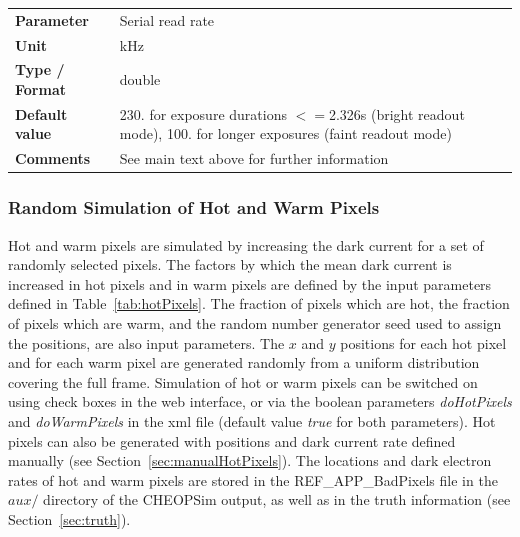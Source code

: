 \documentclass[11pt]{article}      %
\def\HCode#1{}
\def\htmlanchor#1{\HCode{<a id="#1"></a>}}
\begin{document}
\begin{table}[hb]
  \htmlanchor{serialReadRate}
  \begin{tabular}{| l | p{13cm} |}
    \hline 
    {\bf Parameter} & Serial read rate\\
    {\bf Unit} & kHz\\
    {\bf Type / Format} & double\\
    {\bf Default value} & 230. for exposure durations $<=$2.326s (bright readout mode), 100. for longer exposures (faint readout mode)\\
    {\bf Comments} & See main text above for further information\\
    \hline
  \end{tabular}
  \bigskip

  \label{tab:darkCurrent}
\end{table}

\clearpage
\htmlanchor{hotPixels}
\subsubsection{Random Simulation of Hot and Warm Pixels}
\label{sec:hotPixels}

Hot and warm pixels are simulated by increasing the dark current for a set of randomly selected pixels. The factors by which the mean dark current is increased in hot pixels and in warm pixels are defined by the input parameters defined in Table~\ref{tab:hotPixels}. The fraction of pixels which are hot, the fraction of pixels which are warm, and the random number generator seed used to assign the positions, are also input parameters. The $x$ and $y$ positions for each hot pixel and for each warm pixel are generated randomly from a uniform distribution covering the full frame. Simulation of hot or warm pixels can be switched on using check boxes in the web interface, or via the boolean parameters {\it doHotPixels} and {\it doWarmPixels} in the xml file (default value {\it true} for both parameters). Hot pixels can also be generated with positions and dark current rate defined manually (see Section~\ref{sec:manualHotPixels}). The locations and dark electron rates of hot and warm pixels are stored in the REF\_APP\_BadPixels file in the $aux/$ directory of the CHEOPSim output, as well as in the truth information (see Section~\ref{sec:truth}).
\end{document}
